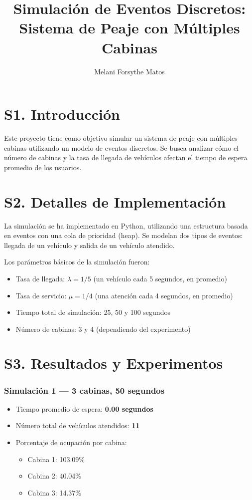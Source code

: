 \documentclass[12pt]{article}
\title{Simulación de Eventos Discretos: Sistema de Peaje con Múltiples Cabinas}
\author{Melani Forsythe Matos}
\date{}
\begin{document}
\maketitle

\section*{S1. Introducción}
Este proyecto tiene como objetivo simular un sistema de peaje con múltiples cabinas utilizando un modelo de eventos discretos. Se busca analizar cómo el número de cabinas y la tasa de llegada de vehículos afectan el tiempo de espera promedio de los usuarios.

\section*{S2. Detalles de Implementación}
La simulación se ha implementado en Python, utilizando una estructura basada en eventos con una cola de prioridad (heap). Se modelan dos tipos de eventos: llegada de un vehículo y salida de un vehículo atendido.

Los parámetros básicos de la simulación fueron:
\begin{itemize}
    \item Tasa de llegada: $\lambda = 1/5$ (un vehículo cada 5 segundos, en promedio)
    \item Tasa de servicio: $\mu = 1/4$ (una atención cada 4 segundos, en promedio)
    \item Tiempo total de simulación: 25, 50 y 100 segundos
    \item Número de cabinas: 3 y 4 (dependiendo del experimento)
\end{itemize}

\section*{S3. Resultados y Experimentos}

\subsubsection*{Simulación 1 — 3 cabinas, 50 segundos}
\begin{itemize}
    \item Tiempo promedio de espera: \textbf{0.00 segundos}
    \item Número total de vehículos atendidos: \textbf{11}
    \item Porcentaje de ocupación por cabina:
    \begin{itemize}
        \item Cabina 1: 103.09\%
        \item Cabina 2: 40.04\%
        \item Cabina 3: 14.37\%
    \end{itemize}
\end{itemize}
\end{document}
